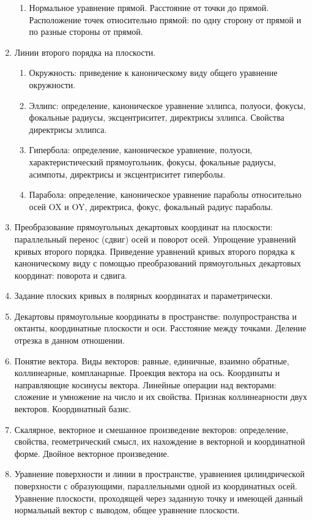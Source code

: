 \documentclass[a4paper,12pt,russian]{extreport}
\begin{document}
\begin{enumerate}
\begin{enumerate}
  \item Нормальное уравнение прямой. Расстояние от точки до прямой. Расположение точек относительно прямой: по одну сторону от прямой и по разные стороны от прямой.
  \end{enumerate}
\item Линии второго порядка на плоскости.
  \begin{enumerate}
  \item Окружность: приведение к каноническому виду общего уравнение окружности.
  \item Эллипс: определение, каноническое уравнение эллипса, полуоси, фокусы, фокальные радиусы, эксцентриситет, директрисы эллипса. Свойства директрисы эллипса.
  \item Гипербола: определение, каноническое уравнение, полуоси, характеристический прямоугольник, фокусы, фокальные радиусы, асимпоты, директрисы и эксцентриситет гиперболы.
  \item Парабола: определение, каноническое уравнение параболы относительно осей OX и OY, директриса, фокус, фокальный радиус параболы.
  \end{enumerate}
\item Преобразование прямоугольных декартовых координат на плоскости: параллельный перенос (сдвиг) осей и поворот осей. Упрощение уравнений кривых второго порядка. Приведение уравнений кривых второго порядка к каноническому виду с помощью преобразований прямоугольных декартовых координат: поворота и сдвига.
\item Задание плоских кривых в полярных координатах и параметрически.
\item Декартовы прямоугольные координаты в пространстве: полупространства и октанты, координатные плоскости и оси. Расстояние между точками. Деление отрезка в данном отношении.
\item Понятие вектора. Виды векторов: равные, единичные, взаимно обратные, коллинеарные, компланарные. Проекция вектора на ось. Координаты и направляющие косинусы вектора. Линейные операции над векторами: сложение и умножение на число и их свойства. Признак коллинеарности двух векторов. Координатный базис.
\item Скалярное, векторное и смешанное произведение векторов: определение, свойства, геометрический смысл, их нахождение в векторной и координатной форме. Двойное векторное произведение.
\item Уравнение поверхности и линии в пространстве, уравнениея цилиндрической поверхности с образующими, параллельными одной из координатных осей. Уравнение плоскости, проходящей через заданную точку и имеющей данный нормальный вектор с выводом, общее уравнение плоскости.

\end{enumerate}
\end{document}
